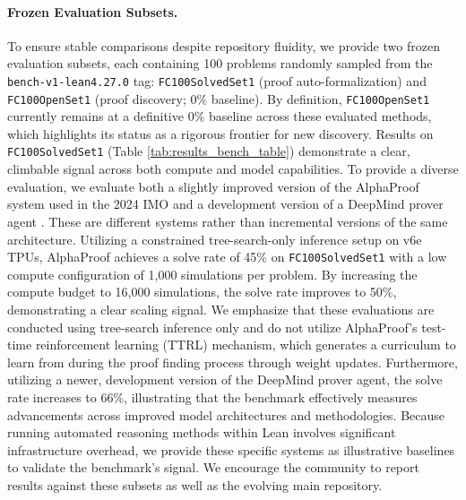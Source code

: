 


\paragraph{Frozen Evaluation Subsets.}
To ensure stable comparisons despite repository fluidity, we provide two frozen evaluation subsets, each containing 100 problems randomly sampled from the \texttt{bench-v1-lean4.27.0} tag: \texttt{FC100SolvedSet1} (proof auto-formalization) and \texttt{FC100OpenSet1} (proof discovery; 0\% baseline).
By definition, \texttt{FC100OpenSet1} currently remains at a definitive 0\% baseline across these evaluated methods, which highlights its status as a rigorous frontier for new discovery.
Results on \texttt{FC100SolvedSet1} (Table \ref{tab:results_bench_table}) demonstrate a clear, climbable signal across both compute and model capabilities.
To provide a diverse evaluation, we evaluate both a slightly improved version of the AlphaProof system used in the 2024 IMO \citep{AlphaProof25} and a development version of a DeepMind prover agent \citep{DMProverAgent26}.
These are different systems rather than incremental versions of the same architecture.
Utilizing a constrained tree-search-only inference setup on v6e TPUs, AlphaProof achieves a solve rate of 45\% on \texttt{FC100SolvedSet1} with a low compute configuration of 1,000 simulations per problem.
By increasing the compute budget to 16,000 simulations, the solve rate improves to 50\%, demonstrating a clear scaling signal.
We emphasize that these evaluations are conducted using tree-search inference only and do not utilize AlphaProof's test-time reinforcement learning (TTRL) mechanism, which generates a curriculum to learn from during the proof finding process through weight updates.
Furthermore, utilizing a newer, development version of the DeepMind prover agent, the solve rate increases to 66\%, illustrating that the benchmark effectively measures advancements across improved model architectures and methodologies.
Because running automated reasoning methods within Lean involves significant infrastructure overhead, we provide these specific systems as illustrative baselines to validate the benchmark's signal.
We encourage the community to report results against these subsets as well as the evolving main repository.

